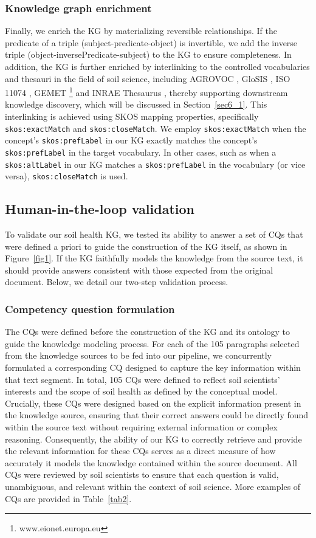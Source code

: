 \documentclass[preprint,12pt]{elsarticle}
\begin{document}
\subsubsection{Knowledge graph enrichment} \label{sec3_3_3}
Finally, we enrich the KG by materializing reversible relationships. If the predicate of a triple (subject-predicate-object) is invertible, we add the inverse triple (object-inversePredicate-subject) to the KG to ensure completeness. In addition, the KG is further enriched by interlinking to the controlled vocabularies and thesauri in the field of soil science, including AGROVOC \citep{SUBIRATSCOLL2022105965}, GloSIS \citep{doi:10.1177/22104968251363767}, ISO 11074 \citep{ISO11074}, GEMET \footnote{www.eionet.europa.eu} and INRAE Thesaurus \citep{aubin:hal-03824794}, thereby supporting downstream knowledge discovery, which will be discussed in Section~\ref{sec6_1}. This interlinking is achieved using SKOS mapping properties, specifically \texttt{skos:exactMatch} and \texttt{skos:closeMatch}. We employ \texttt{skos:exactMatch} when the concept's \texttt{skos:prefLabel} in our KG exactly matches the concept's \texttt{skos:prefLabel} in the target vocabulary. In other cases, such as when a \texttt{skos:altLabel} in our KG matches a \texttt{skos:prefLabel} in the vocabulary (or vice versa), \texttt{skos:closeMatch} is used.


\subsection{Human-in-the-loop validation} \label{sec3_4}
To validate our soil health KG, we tested its ability to answer a set of CQs that were defined a priori to guide the construction of the KG itself, as shown in Figure~\ref{fig1}. If the KG faithfully models the knowledge from the source text, it should provide answers consistent with those expected from the original document. Below, we detail our two-step validation process.

\subsubsection{Competency question formulation}
The CQs were defined before the construction of the KG and its ontology to guide the knowledge modeling process. For each of the 105 paragraphs selected from the knowledge sources to be fed into our pipeline, we concurrently formulated a corresponding CQ designed to capture the key information within that text segment. In total, 105 CQs were defined to reflect soil scientists' interests and the scope of soil health as defined by the conceptual model. Crucially, these CQs were designed based on the explicit information present in the knowledge source, ensuring that their correct answers could be directly found within the source text without requiring external information or complex reasoning. Consequently, the ability of our KG to correctly retrieve and provide the relevant information for these CQs serves as a direct measure of how accurately it models the knowledge contained within the source document. All CQs were reviewed by soil scientists to ensure that each question is valid, unambiguous, and relevant within the context of soil science. More examples of CQs are provided in Table~\ref{tab2}.
\end{document}
